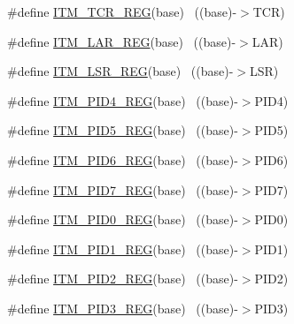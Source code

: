 \begin{DoxyCompactItemize}
\#define \hyperlink{group___i_t_m___register___accessor___macros_gaded31ba9ed7d78748d2ec3fb8746caff}{I\+T\+M\+\_\+\+T\+C\+R\+\_\+\+R\+EG}(base)                                            ~((base)-\/$>$T\+CR)
\item 
\#define \hyperlink{group___i_t_m___register___accessor___macros_ga20b6604c5d16c42c91578bb58acc8249}{I\+T\+M\+\_\+\+L\+A\+R\+\_\+\+R\+EG}(base)                                            ~((base)-\/$>$L\+AR)
\item 
\#define \hyperlink{group___i_t_m___register___accessor___macros_gabbc1e9dd748b0d19926b2c64c868606d}{I\+T\+M\+\_\+\+L\+S\+R\+\_\+\+R\+EG}(base)                                            ~((base)-\/$>$L\+SR)
\item 
\#define \hyperlink{group___i_t_m___register___accessor___macros_ga0d86c795356f8b5785a8d32963143e18}{I\+T\+M\+\_\+\+P\+I\+D4\+\_\+\+R\+EG}(base)                                          ~((base)-\/$>$P\+I\+D4)
\item 
\#define \hyperlink{group___i_t_m___register___accessor___macros_ga4740a0d11d383ca9f9406176f83f736e}{I\+T\+M\+\_\+\+P\+I\+D5\+\_\+\+R\+EG}(base)                                          ~((base)-\/$>$P\+I\+D5)
\item 
\#define \hyperlink{group___i_t_m___register___accessor___macros_gabc5f851ab862e91124ef9a5d54ed0c23}{I\+T\+M\+\_\+\+P\+I\+D6\+\_\+\+R\+EG}(base)                                          ~((base)-\/$>$P\+I\+D6)
\item 
\#define \hyperlink{group___i_t_m___register___accessor___macros_ga4d55d1ec8c7452f081f103a4e4ded062}{I\+T\+M\+\_\+\+P\+I\+D7\+\_\+\+R\+EG}(base)                                          ~((base)-\/$>$P\+I\+D7)
\item 
\#define \hyperlink{group___i_t_m___register___accessor___macros_ga77332c9b64d98cdd7229a6e1953f6a33}{I\+T\+M\+\_\+\+P\+I\+D0\+\_\+\+R\+EG}(base)                                          ~((base)-\/$>$P\+I\+D0)
\item 
\#define \hyperlink{group___i_t_m___register___accessor___macros_gabd8e07732053603e273fa17f9d125ebe}{I\+T\+M\+\_\+\+P\+I\+D1\+\_\+\+R\+EG}(base)                                          ~((base)-\/$>$P\+I\+D1)
\item 
\#define \hyperlink{group___i_t_m___register___accessor___macros_gaf1651b0bd0b4631207e3437f8cfaddaa}{I\+T\+M\+\_\+\+P\+I\+D2\+\_\+\+R\+EG}(base)                                          ~((base)-\/$>$P\+I\+D2)
\item 
\#define \hyperlink{group___i_t_m___register___accessor___macros_ga4f8b157b66d8df5fcaf166f56cf1fee1}{I\+T\+M\+\_\+\+P\+I\+D3\+\_\+\+R\+EG}(base)                                          ~((base)-\/$>$P\+I\+D3)

\end{DoxyCompactItemize}
